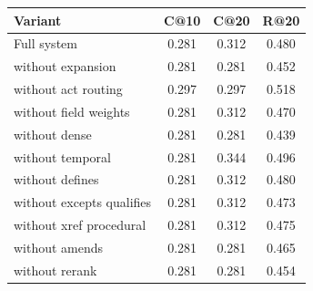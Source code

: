 \begin{tabular*}{\linewidth}{@{\extracolsep{\fill}}lccc}
\toprule
Variant & C@10 & C@20 & R@20 \\
\midrule
Full system & 0.281 & 0.312 & 0.480 \\
\quad without expansion & 0.281 & 0.281 & 0.452 \\
\quad without act routing & 0.297 & 0.297 & 0.518 \\
\quad without field weights & 0.281 & 0.312 & 0.470 \\
\quad without dense & 0.281 & 0.281 & 0.439 \\
\quad without temporal & 0.281 & 0.344 & 0.496 \\
\quad without defines & 0.281 & 0.312 & 0.480 \\
\quad without excepts qualifies & 0.281 & 0.312 & 0.473 \\
\quad without xref procedural & 0.281 & 0.312 & 0.475 \\
\quad without amends & 0.281 & 0.281 & 0.465 \\
\quad without rerank & 0.281 & 0.281 & 0.454 \\
\bottomrule
\end{tabular*}
